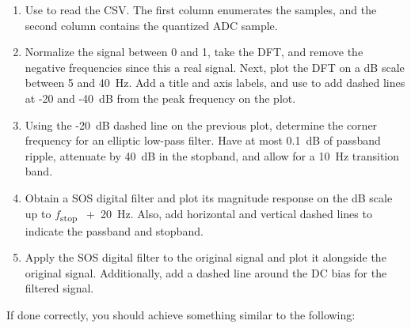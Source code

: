 \documentclass{article}
\begin{document}
\begin{enumerate}[leftmargin=*]
	\item
		Use  to read the CSV.  The
		first column enumerates the samples, and the second
		column contains the quantized ADC sample. 

	\item
		Normalize the signal between 0 and 1, take the DFT, and
		remove the negative frequencies since this a real
		signal.  Next, plot the DFT on a dB scale between 5 and
		40~Hz.  Add a title and axis labels, and use  to add dashed lines at -20 and -40~dB from the
		peak frequency on the plot.

	\item
		Using the -20~dB dashed line on the previous plot,
		determine the corner frequency for an elliptic low-pass
		filter.  Have at most 0.1~dB of passband ripple,
		attenuate by 40~dB in the stopband, and allow for a
		10~Hz transition band.

	\item
		Obtain a SOS digital filter and plot its magnitude
		response on the dB scale up to \(f\)\textsubscript{stop%
		}~+~20~Hz.  Also, add horizontal and vertical dashed
		lines to indicate the passband and stopband.

	\item
		Apply the SOS digital filter to the original signal and
		plot it alongside the original signal.  Additionally,
		add a dashed line around the DC bias for the filtered
		signal.
\end{enumerate}

If done correctly, you should achieve something similar to the
following: 
\end{document}
